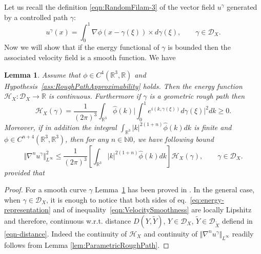 \documentclass[11pt,a4paper,reqno]{amsart}%
\theoremstyle{plain}
\theoremstyle{remark}
\theoremstyle{plain}
\newtheorem{lemma}[theorem]{Lemma}
\numberwithin{equation}{section}
\def\Rnu{{\mathbb R}}
\begin{document}
Let us recall the definition \eqref{eqn:RandomFilam-3} of the vector field $u^\gamma$ generated by a controlled path $\gamma$:
\begin{equation}
u^\gamma(x)=\int_0^1\nabla\phi(x-\gamma(\xi))\times d \gamma(\xi),\qquad \gamma\in
\mathcal{D}_X.\label{eqn:RandomFilam-3'}
\end{equation}
Now we will show that if the energy functional of $\gamma$ is bounded then the
associated velocity field  is a smooth function. We have
\begin{lemma}%
\label{lem:VelocitySmoothness}
Assume that $\phi\in C^4(\Rnu^3,\Rnu)$ and Hypothesis~\ref{ass:RoughPathApproximability} holds. Then the energy function
$\mathcal{H}_X:\mathcal{D}_X\to\Rnu$ is  continuous. Furthermore if $\gamma$ is a geometric rough path then
\begin{equation}
\label{eq:energy-representation}
\mathcal{H}_X(\gamma) =\frac{1}{(2\pi)^3}\int_{\Rnu^3}\hat{\phi}(k)\Big\vert \int_0^1 e^{i(k,\gamma(\xi))}d\gamma(\xi)\Big\vert^2dk \ge 0.
\end{equation}
Moreover,  if in addition the integral
$\int_{\Rnu^3}\vert {k}\vert^{2(1+n)}\hat{\phi}({k})d{k}$ is
finite and $\phi\in C^{n+4}(\Rnu^3,\Rnu^3)$, then  for any $n\in \mathbb{N}0$, we have following bound
\begin{equation}
\Vert \nabla^n u^{\gamma}\Vert^2_{L^{\infty}}\leq
\frac{1}{(2\pi)^{3}}\left[\int_{\Rnu^3}\vert {k}\vert^{2(1+n)}\hat{\phi}({k})d{k}\right]\mathcal{H}_X(\gamma),\qquad
\gamma\in\mathcal{D}_X.\label{eqn:VelocitySmoothness}
\end{equation}
provided that 
\end{lemma}
\begin{proof}%
For a smooth curve $\gamma$ Lemma~\ref{lem:VelocitySmoothness} has been proved in
\cite[Lemma~3]{[Bers+Gub_2007]}. In the general case, when
$\gamma\in\mathcal{D}_X$, it is enough to notice that both sides
of eq.~\eqref{eq:energy-representation} and of inequality~\eqref{eqn:VelocitySmoothness} are locally Lipshitz
and therefore, continuous w.r.t. distance
$D(Y,\tilde{Y})$, $Y\in\mathcal{D}_X$,
$\tilde{Y}\in\mathcal{D}_{\tilde{X}}$ defiend in \eqref{eqn-distance}. Indeed the continuity of
$\mathcal{H}_X$  and continuity of $\Vert \nabla^n
u^{\gamma}\Vert_{L^{\infty}}$ readily follows from Lemma
\ref{lem:ParametricRoughPath}.
\end{proof}
\end{document}
